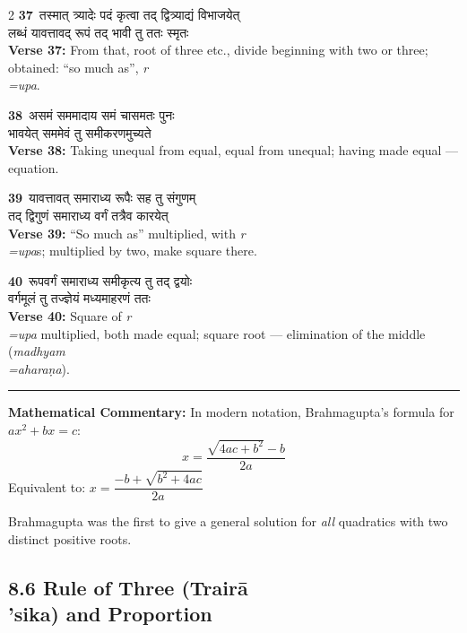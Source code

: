 \documentclass[11pt,a4paper]{article}
\newcommand{\dev}[1]{{\devanagarifont #1}}
\newcommand{\iast}[1]{\textit{#1}}
\newcommand{\vnum}[1]{\textcolor{versenumbercolor}{\textbf{#1}}}
\begin{document}
\begin{paracol}{2}
\switchcolumn[0]
\vnum{37}\ \dev{तस्मात् त्र्यादेः पदं कृत्वा तद् द्वित्र्याद्यं विभाजयेत्}\\
\dev{लब्धं यावत्तावद् रूपं तद् भावी तु ततः स्मृतः}\\
\switchcolumn[1]
\textbf{Verse 37:} From that, root of three etc., divide beginning with two or three; obtained: ``so much as'', \iast{r\\=upa}.

\switchcolumn[0]
\vnum{38}\ \dev{असमं सममादाय समं चासमतः पुनः}\\
\dev{भावयेत् सममेवं तु समीकरणमुच्यते}\\
\switchcolumn[1]
\textbf{Verse 38:} Taking unequal from equal, equal from unequal; having made equal --- equation.

\switchcolumn[0]
\vnum{39}\ \dev{यावत्तावत् समाराध्य रूपैः सह तु संगुणम्}\\
\dev{तद् द्विगुणं समाराध्य वर्गं तत्रैव कारयेत्}\\
\switchcolumn[1]
\textbf{Verse 39:} ``So much as'' multiplied, with \iast{r\\=upa}s; multiplied by two, make square there.

\switchcolumn[0]
\vnum{40}\ \dev{रूपवर्गं समाराध्य समीकृत्य तु तद् द्वयोः}\\
\dev{वर्गमूलं तु तज्ज्ञेयं मध्यमाहरणं ततः}\\
\switchcolumn[1]
\textbf{Verse 40:} Square of \iast{r\\=upa} multiplied, both made equal; square root --- elimination of the middle (\iast{madhyam\\=ahara\d na}).

\end{paracol}

\vspace{0.3em}
\noindent\rule{\textwidth}{0.4pt}
\vspace{0.2em}
\noindent\textbf{Mathematical Commentary:} In modern notation, Brahmagupta's formula for $ax^2 + bx = c$:
\[x = \frac{\sqrt{4ac + b^2} - b}{2a}\]
Equivalent to: $x = \dfrac{-b + \sqrt{b^2 + 4ac}}{2a}$

Brahmagupta was the first to give a general solution for \textit{all} quadratics with two distinct positive roots.
\vspace{0.3em}

\subsection*{8.6 Rule of Three (Trair\=a\\'sika) and Proportion}
\label{sec:8.6}
\end{document}
